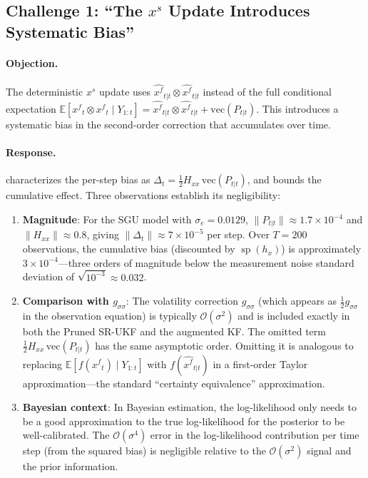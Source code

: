 \documentclass[12pt,a4paper]{article}
\newcommand{\E}{\mathbb{E}}
\newcommand{\vect}{\mathrm{vec}}
\newcommand{\kron}{\otimes}
\newcommand{\xf}{{x^{f}}}
\newcommand{\xs}{{x^{s}}}
\newcommand{\hx}{h_x}
\newcommand{\Hxx}{H_{xx}}
\newcommand{\gss}{{g_{\sigma\sigma}}}
\newcommand{\cO}{\mathcal{O}}
\DeclareMathOperator{\specrad}{sp}
\begin{document}
\subsection{Challenge 1: ``The $\xs$ Update Introduces Systematic Bias''}
\label{sec:challenge-bias}

\paragraph{Objection.}
The deterministic $\xs$ update uses
$\hat{\xf}_{t|t} \kron \hat{\xf}_{t|t}$ instead of the full
conditional expectation
$\E[\xf_t \kron \xf_t \mid Y_{1:t}]
= \hat{\xf}_{t|t} \kron \hat{\xf}_{t|t} + \vect(P_{t|t})$.
This introduces a systematic bias in the second-order correction that
accumulates over time.

\paragraph{Response.}
 characterizes the per-step bias as
$\Delta_t = \tfrac{1}{2}\Hxx\,\vect(P_{t|t})$, and
 bounds the cumulative effect. Three observations
establish its negligibility:

\begin{enumerate}[nosep]
\item \textbf{Magnitude}: For the SGU model with $\sigma_e = 0.0129$,
$\|P_{t|t}\| \approx 1.7 \times 10^{-4}$ and $\|\Hxx\| \approx 0.8$,
giving $\|\Delta_t\| \approx 7 \times 10^{-5}$ per step. Over
$T = 200$ observations, the cumulative bias (discounted by $\specrad(\hx)$)
is approximately $3 \times 10^{-4}$---three orders of magnitude below
the measurement noise standard deviation of $\sqrt{10^{-3}} \approx 0.032$.

\item \textbf{Comparison with $\gss$}: The volatility correction
$\gss$ (which appears as $\tfrac{1}{2}\gss$ in the observation
equation) is typically $\cO(\sigma^2)$ and is included exactly in
both the Pruned SR-UKF and the augmented KF. The omitted term
$\tfrac{1}{2}\Hxx\,\vect(P_{t|t})$ has the same asymptotic order.
Omitting it is analogous to replacing
$\E[f(\xf_t) \mid Y_{1:t}]$ with $f(\hat{\xf}_{t|t})$ in a
first-order Taylor approximation---the standard ``certainty
equivalence'' approximation.

\item \textbf{Bayesian context}: In Bayesian estimation, the
log-likelihood only needs to be a good approximation to the true
log-likelihood for the posterior to be well-calibrated. The
$\cO(\sigma^4)$ error in the log-likelihood contribution per time
step (from the squared bias) is negligible relative to the
$\cO(\sigma^2)$ signal and the prior information.
\end{enumerate}
\end{document}
